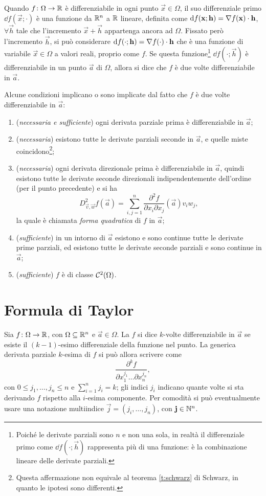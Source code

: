 Quando $f\colon\Omega\to\mathbb{R}$ è differenziabile in ogni punto $\vec x\in\Omega$, il suo differenziale primo $\dd f(\vec x;\cdot)$ è una funzione da $\mathbb{R}^n$ a $\mathbb{R}$ lineare, definita come $\textup{d} f(\mathbf{x};\mathbf{h})={\nabla f(\mathbf{x})}\cdot{\mathbf{h}}$, $\forall\vec h$ tale che l'incremento $\vec x+\vec h$ appartenga ancora ad $\Omega$. Fissato però l'incremento $\vec h$, si può considerare $\textup{d} f(\cdot;\mathbf{h})={\nabla f(\cdot)}\cdot{\mathbf{h}}$ che è una funzione di variabile $\vec x\in\Omega$ a valori reali, proprio come $f$. Se questa funzione\footnote{Poiché le derivate parziali sono $n$ e non una sola, in realtà il differenziale primo come $\dd f(\cdot;\vec h)$ rappresenta più di una funzione: è la combinazione lineare delle derivate parziali.} $\dd f(\cdot;\vec h)$ è differenziabile in un punto $\vec a$ di $\Omega$, allora si dice che $f$ è due volte differenziabile in $\vec a$.

Alcune condizioni implicano o sono implicate dal fatto che $f$ è due volte differenziabile in $\vec a$:
\begin{enumerate}
\item (\textit{necessaria e sufficiente}) ogni derivata parziale prima è differenziabile in $\vec a$;
\item (\textit{necessaria}) esistono tutte le derivate parziali seconde in $\vec a$, e quelle miste coincidono\footnote{Questa affermazione non equivale al teorema \ref{t:schwarz} di Schwarz, in quanto le ipotesi sono differenti.};
\item (\textit{necessaria}) ogni derivata direzionale prima è differenziabile in $\vec a$, quindi esistono tutte le derivate seconde direzionali indipendentemente dell'ordine (per il punto precedente) e si ha
\[
D^2_{\vec v,\vec w}f(\vec a)=\sum_{i,j=1}^n\frac{\partial^2f}{\partial x_i\partial x_j}(\vec a)v_iw_j,
\]
la quale è chiamata \emph{forma quadratica} di $f$ in $\vec a$;
\item (\textit{sufficiente}) in un intorno di $\vec a$ esistono e sono continue tutte le derivate prime parziali, ed esistono tutte le derivate seconde parziali e sono continue in $\vec a$;
\item (\textit{sufficiente}) $f$ è di classe $\mathcal{C}^{{2}}(\Omega)$.
\end{enumerate}

\section{Formula di Taylor}
Sia $f\colon\Omega\to\mathbb{R}$, con $\Omega\subseteq\mathbb{R}^n$ e $\vec a\in\Omega$. La $f$ si dice $k$-volte differenziabile in $\vec a$ se esiste il $(k-1)$-esimo differenziale della funzione nel punto.
La generica derivata parziale $k$-esima di $f$ si può allora scrivere come
\[
\frac{\partial^kf}{\partial x_1^{j_1}\dots\partial x_n^{j_n}},
\]
con $0\leq j_1,\dots,j_n\leq n$ e $\sum_{i=1}^nj_i=k$; gli indici $j_i$ indicano quante volte si sta derivando $f$ rispetto alla $i$-esima componente.
Per comodità si può eventualmente usare una notazione multiindice $\vec j=(j_i,\dots,j_n)$, con $\mathbf{j}\in\mathbb{N}^n$.

